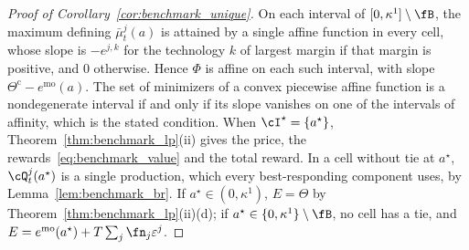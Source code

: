     \begin{proof}[Proof of Corollary~\ref{cor:benchmark_unique}]
        On each interval of $[0, \kappa^1] \setminus \fB$, the maximum defining $\bar\mu^j_t(a)$ is attained by a single affine function in every cell, whose slope is $-e^{j,k}$ for the technology $k$ of largest margin if that margin is positive, and $0$ otherwise. Hence $\Phi$ is affine on each such interval, with slope $\Theta^{\mathrm c} - e^{\mathrm{mo}}(a)$. The set of minimizers of a convex piecewise affine function is a nondegenerate interval if and only if its slope vanishes on one of the intervals of affinity, which is the stated condition. When $\cI^\star = \{a^\star\}$, Theorem~\ref{thm:benchmark_lp}(ii) gives the price, the rewards~\eqref{eq:benchmark_value} and the total reward. In a cell without tie at $a^\star$, $\cQ^j_t(a^\star)$ is a single production, which every best-responding component uses, by Lemma~\ref{lem:benchmark_br}. If $a^\star \in (0, \kappa^1)$, $E = \Theta$ by Theorem~\ref{thm:benchmark_lp}(ii)(d); if $a^\star \in \{0, \kappa^1\} \setminus \fB$, no cell has a tie, and $E = e^{\mathrm{mo}}(a^\star) + T\sum_j \fn_j \varepsilon^j$.
    \end{proof}
